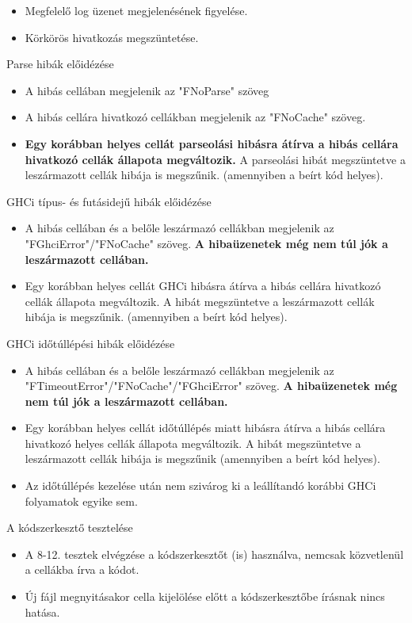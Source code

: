 \begin{compactenum}
\begin{itemize}
		\item Megfelelő log üzenet megjelenésének figyelése.		
		\item Körkörös hivatkozás megszüntetése.
	\end{itemize}
	\item Parse hibák előidézése
	\begin{itemize}
		\item A hibás cellában megjelenik az "FNoParse" szöveg
		\item A hibás cellára hivatkozó cellákban megjelenik az "FNoCache" szöveg.
		\item \textbf{Egy korábban helyes cellát parseolási hibásra átírva a hibás cellára hivatkozó cellák állapota megváltozik.} A parseolási hibát megszüntetve a leszármazott cellák hibája is megszűnik. (amennyiben a beírt kód helyes).
	\end{itemize}
	\item GHCi típus- és futásidejű hibák előidézése
	\begin{itemize}
		\item A hibás cellában és a belőle leszármazó cellákban megjelenik az "FGhciError"/"FNoCache" szöveg. \textbf{A hibaüzenetek még nem túl jók a leszármazott cellában.}
		\item Egy korábban helyes cellát GHCi hibásra átírva a hibás cellára hivatkozó cellák állapota megváltozik. A hibát megszüntetve a leszármazott cellák hibája is megszűnik. (amennyiben a beírt kód helyes).
	\end{itemize}
	\item GHCi időtúllépési hibák előidézése
	\begin{itemize}
		\item A hibás cellában és a belőle leszármazó cellákban megjelenik az "FTimeoutError"/"FNoCache"/"FGhciError" szöveg. \textbf{A hibaüzenetek még nem túl jók a leszármazott cellában.}
		\item Egy korábban helyes cellát időtúllépés miatt hibásra átírva a hibás cellára hivatkozó helyes cellák állapota megváltozik. A hibát megszüntetve a leszármazott cellák hibája is megszűnik (amennyiben a beírt kód helyes).
		\item Az időtúllépés kezelése után nem szivárog ki a leállítandó korábbi GHCi folyamatok egyike sem.
	\end{itemize}
	\item A kódszerkesztő tesztelése 
	\begin{itemize}
		\item A 8-12. tesztek elvégzése a kódszerkesztőt (is) használva, nemcsak közvetlenül a cellákba írva a kódot.
		\item Új fájl megnyitásakor cella kijelölése előtt a kódszerkesztőbe írásnak nincs hatása.	
	\end{itemize}		
\end{compactenum}
